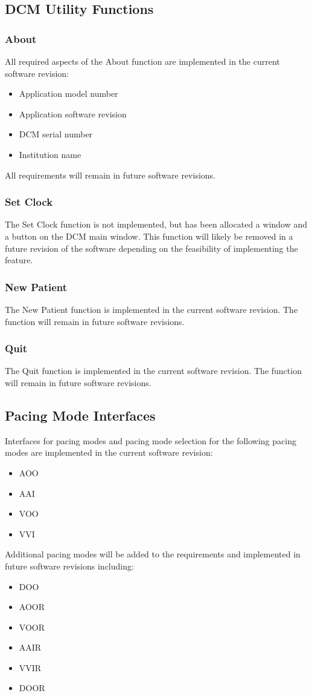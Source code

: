 \documentclass[12pt]{article}
\begin{document}
\subsection{DCM Utility Functions}
\subsubsection{About}
All required aspects of the About function are implemented in the current software revision:
\begin{itemize}
    \item Application model number
    \item Application software revision
    \item DCM serial number
    \item Institution name
\end{itemize}
All requirements will remain in future software revisions.

\subsubsection{Set Clock}
The Set Clock function is not implemented, but has been allocated a window and a button on the DCM main window. This function will likely be removed in a future revision of the software depending on the feasibility of implementing the feature.

\subsubsection{New Patient}
The New Patient function is implemented in the current software revision. The function will remain in future software revisions.

\subsubsection{Quit}
The Quit function is implemented in the current software revision. The function will remain in future software revisions.

\subsection{Pacing Mode Interfaces}
Interfaces for pacing modes and pacing mode selection for the following pacing modes are implemented in the current software revision:
\begin{itemize}
    \item AOO
    \item AAI
    \item VOO
    \item VVI
\end{itemize}
Additional pacing modes will be added to the requirements and implemented in future software revisions including:
\begin{itemize}
    \item DOO
    \item AOOR
    \item VOOR
    \item AAIR
    \item VVIR
    \item DOOR
\end{itemize}
\end{document}
